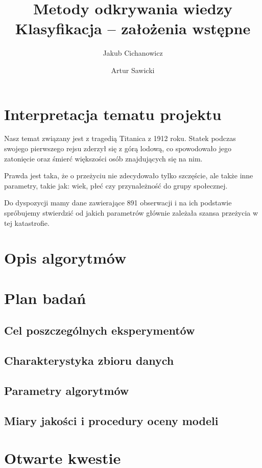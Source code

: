 \documentclass{article}
\begin{document}
\title{Metody odkrywania wiedzy \\%
{\large Klasyfikacja -- założenia wstępne} }

\author{Jakub Cichanowicz \and Artur Sawicki}

\maketitle

\section{Interpretacja tematu projektu}
Nasz temat związany jest z tragedią Titanica z 1912 roku. Statek podczas swojego pierwszego rejsu zderzył się z górą lodową, co spowodowało jego zatonięcie oraz śmierć większości osób znajdujących się na nim.

Prawda jest taka, że o przeżyciu nie zdecydowało tylko szczęście, ale także inne parametry, takie jak: wiek, płeć czy przynależność do grupy społecznej.

Do dyspozycji mamy dane zawierające 891 obserwacji i na ich podstawie spróbujemy stwierdzić od jakich parametrów głównie zależała szansa przeżycia w tej katastrofie.

\section{Opis algorytmów}

\section{Plan badań}

\subsection{Cel poszczególnych eksperymentów}
\subsection{Charakterystyka zbioru danych}
\subsection{Parametry algorytmów}
\subsection{Miary jakości i procedury oceny modeli}

\section{Otwarte kwestie}
\end{document}
